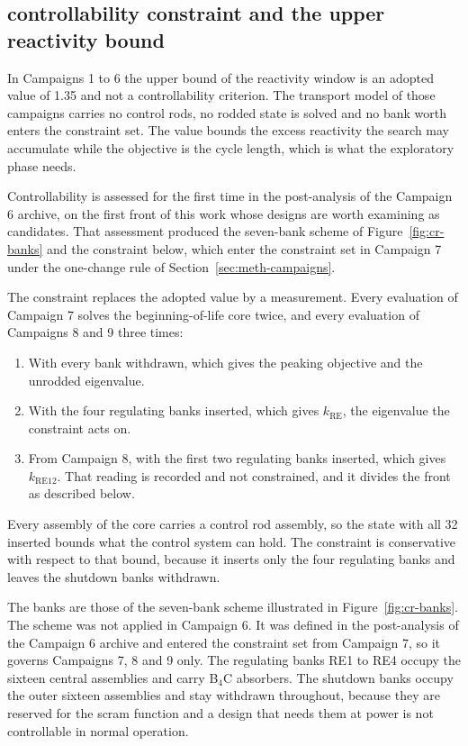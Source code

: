 \subsection{controllability constraint and the upper reactivity bound}
\label{sec:meth-ctrl}

In Campaigns 1 to 6 the upper bound of the reactivity window is an
adopted value of 1.35 and not a controllability criterion.
The transport model of those campaigns carries no control rods, no
rodded state is solved and no bank worth enters the constraint set. The
value bounds the excess reactivity the search may accumulate while the
objective is the cycle length, which is what the exploratory phase
needs.

Controllability is assessed for the first time in the post-analysis of
the Campaign 6 archive, on the first front of this work whose designs
are worth examining as candidates. That assessment produced the
seven-bank scheme of Figure~\ref{fig:cr-banks} and the constraint below,
which enter the constraint set in Campaign 7 under the one-change rule
of Section~\ref{sec:meth-campaigns}.

The constraint replaces the adopted value by a measurement. Every
evaluation of Campaign 7 solves the beginning-of-life core twice, and
every evaluation of Campaigns 8 and 9 three times:

\begin{enumerate}
  \item With every bank withdrawn, which gives the peaking objective
        and the unrodded eigenvalue.

  \item With the four regulating banks inserted, which gives
        $k_\mathrm{RE}$, the eigenvalue the constraint acts on.

  \item From Campaign 8, with the first two regulating banks inserted,
        which gives $k_\mathrm{RE12}$. That reading is recorded and not
        constrained, and it divides the front as described below.
\end{enumerate}

Every assembly of the core carries a control rod assembly, so the
state with all 32 inserted bounds what the control system can hold. The
constraint is conservative with respect to that bound, because it inserts
only the four regulating banks and leaves the shutdown banks
withdrawn.

The banks are those of the seven-bank scheme illustrated in
Figure~\ref{fig:cr-banks}. The scheme was not applied in Campaign 6. It
was defined in the post-analysis of the Campaign 6 archive and entered
the constraint set from Campaign 7, so it governs Campaigns 7, 8 and 9
only. The regulating banks RE1 to RE4
occupy the sixteen central assemblies and carry B$_4$C absorbers. The
shutdown banks occupy the outer sixteen assemblies and stay withdrawn
throughout, because they are reserved for the scram function and a
design that needs them at power is not controllable in normal
operation.

